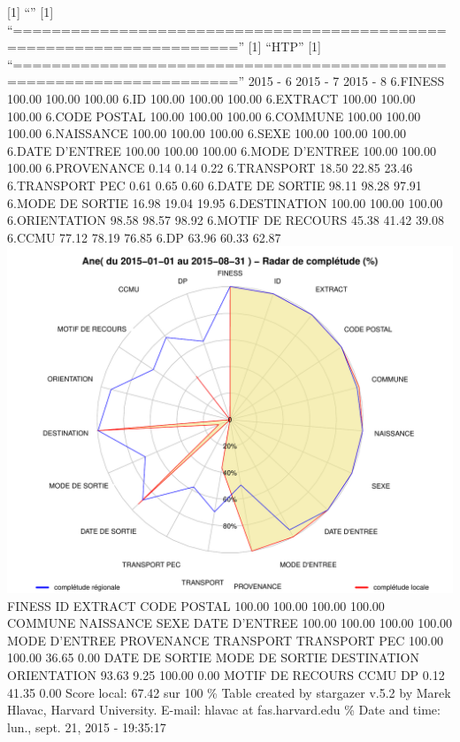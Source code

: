 \documentclass[]{article}
\begin{document}
{[}1{]} ``'' {[}1{]}
``=====================================================================''
{[}1{]} ``HTP'' {[}1{]}
``=====================================================================''
2015 - 6 2015 - 7 2015 - 8 6.FINESS 100.00 100.00 100.00 6.ID 100.00
100.00 100.00 6.EXTRACT 100.00 100.00 100.00 6.CODE POSTAL 100.00 100.00
100.00 6.COMMUNE 100.00 100.00 100.00 6.NAISSANCE 100.00 100.00 100.00
6.SEXE 100.00 100.00 100.00 6.DATE D'ENTREE 100.00 100.00 100.00 6.MODE
D'ENTREE 100.00 100.00 100.00 6.PROVENANCE 0.14 0.14 0.22 6.TRANSPORT
18.50 22.85 23.46 6.TRANSPORT PEC 0.61 0.65 0.60 6.DATE DE SORTIE 98.11
98.28 97.91 6.MODE DE SORTIE 16.98 19.04 19.95 6.DESTINATION 100.00
100.00 100.00 6.ORIENTATION 98.58 98.57 98.92 6.MOTIF DE RECOURS 45.38
41.42 39.08 6.CCMU 77.12 78.19 76.85 6.DP 63.96 60.33 62.87
\includegraphics{completude_files/figure-latex/finess-17.pdf} FINESS ID
EXTRACT CODE POSTAL 100.00 100.00 100.00 100.00 COMMUNE NAISSANCE SEXE
DATE D'ENTREE 100.00 100.00 100.00 100.00 MODE D'ENTREE PROVENANCE
TRANSPORT TRANSPORT PEC 100.00 100.00 36.65 0.00 DATE DE SORTIE MODE DE
SORTIE DESTINATION ORIENTATION 93.63 9.25 100.00 0.00 MOTIF DE RECOURS
CCMU DP 0.12 41.35 0.00 Score local: 67.42 sur 100 \% Table created by
stargazer v.5.2 by Marek Hlavac, Harvard University. E-mail: hlavac at
fas.harvard.edu \% Date and time: lun., sept. 21, 2015 - 19:35:17
\end{document}
